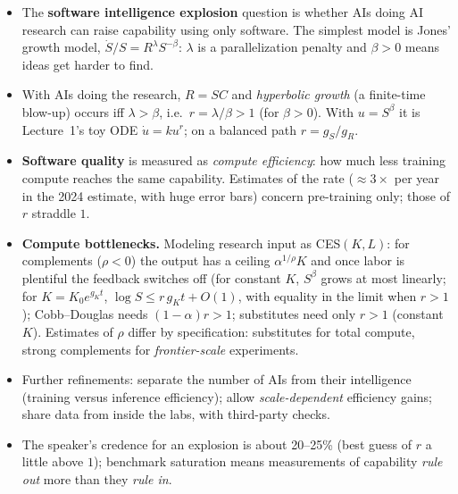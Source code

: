 \begin{takeaways}
\begin{itemize}
  \item The \textbf{software intelligence explosion} question is whether AIs doing AI research can raise capability using only software. The simplest model is Jones' growth model, $\dot S/S=R^{\lambda}S^{-\beta}$: $\lambda$ is a parallelization penalty and $\beta>0$ means ideas get harder to find.
  \item With AIs doing the research, $R=SC$ and \emph{hyperbolic growth} (a finite-time blow-up) occurs iff $\lambda>\beta$, i.e.\ $r=\lambda/\beta>1$ (for $\beta>0$). With $u=S^\beta$ it is Lecture~1's toy ODE $\dot u=ku^r$; on a balanced path $r=g_S/g_R$.
  \item \textbf{Software quality} is measured as \emph{compute efficiency}: how much less training compute reaches the same capability. Estimates of the rate ($\approx3\times$ per year in the 2024 estimate, with huge error bars) concern pre-training only; those of $r$ straddle $1$.
  \item \textbf{Compute bottlenecks.} Modeling research input as CES$(K,L)$: for complements ($\rho<0$) the output has a ceiling $\alpha^{1/\rho}K$ and once labor is plentiful the feedback switches off (for constant $K$, $S^\beta$ grows at most linearly; for $K=K_0e^{g_Kt}$, $\log S\le r\,g_Kt+O(1)$, with equality in the limit when $r>1$); Cobb--Douglas needs $(1-\alpha)r>1$; substitutes need only $r>1$ (constant $K$). Estimates of $\rho$ differ by specification: substitutes for total compute, strong complements for \emph{frontier-scale} experiments.
  \item Further refinements: separate the number of AIs from their intelligence (training versus inference efficiency); allow \emph{scale-dependent} efficiency gains; share data from inside the labs, with third-party checks.
  \item The speaker's credence for an explosion is about 20--25\% (best guess of $r$ a little above $1$); benchmark saturation means measurements of capability \emph{rule out} more than they \emph{rule in}.
\end{itemize}
\end{takeaways}

